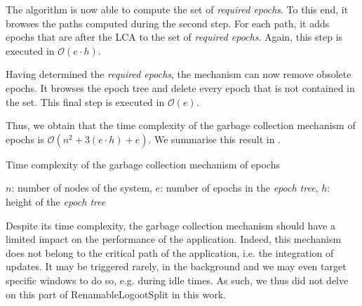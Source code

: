 \documentclass[10pt,journal,compsoc]{IEEEtran}
\let\MYoriglatexcaption\caption
\renewcommand{\caption}[2][\relax]{\MYoriglatexcaption[#2]{#2}}
\newcommand{\eg}{e.g. }
\newcommand{\ie}{i.e. }
\newcommand{\bigO}[1]{$\mathcal{O}(#1)$}
\begin{document}
The algorithm is now able to compute the set of \emph{required epochs}.
To this end, it browses the paths computed during the second step.
For each path, it adds epochs that are after the \ac{LCA} to the set of \emph{required epochs}.
Again, this step is executed in \bigO{e \cdot h}.

Having determined the \emph{required epochs}, the mechanism can now remove obsolete epochs.
It browses the epoch tree and delete every epoch that is not contained in the set.
This final step is executed in \bigO{e}.

Thus, we obtain that the time complexity of the garbage collection mechanism of epochs is \bigO{n^2 + 3 (e \cdot h) + e}.
We summarise this result in .

\begin{table}[!ht]
    \centering
    \caption{Time complexity of the garbage collection mechanism of epochs}
    \label{tab:time-complexity-gc-mechanism-epochs}
    \caption*{$n$: number of nodes of the system, $e$: number of epochs in the \emph{epoch tree}, $h$: height of the \emph{epoch tree}}
\end{table}

Despite its time complexity, the garbage collection mechanism should have a limited impact on the performance of the application.
Indeed, this mechanism does not belong to the critical path of the application, \ie the integration of updates.
It may be triggered rarely, in the background and we may even target specific windows to do so, \eg during idle times.
As such, we thus did not delve on this part of RenamableLogootSplit in this work.
\end{document}
